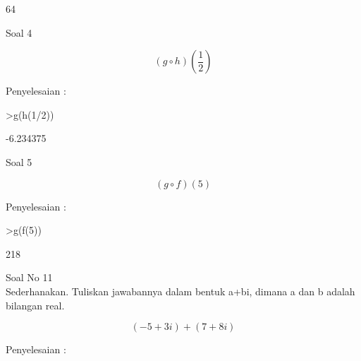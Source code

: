 \begin{eulernotebook}
\begin{eulercomment}
\begin{eulercomment}
\begin{euleroutput}
  64
\end{euleroutput}
\begin{eulercomment}
Soal 4\\
\end{eulercomment}
\begin{eulerformula}
\[
(g \circ h)(\frac{1}{2})
\]
\end{eulerformula}
\begin{eulercomment}
Penyelesaian :
\end{eulercomment}
\begin{eulerprompt}
>g(h(1/2))
\end{eulerprompt}
\begin{euleroutput}
  -6.234375
\end{euleroutput}
\begin{eulercomment}
Soal 5\\
\end{eulercomment}
\begin{eulerformula}
\[
(g \circ f)(5)
\]
\end{eulerformula}
\begin{eulercomment}
Penyelesaian :
\end{eulercomment}
\begin{eulerprompt}
>g(f(5))
\end{eulerprompt}
\begin{euleroutput}
  218\\
  
\end{euleroutput}

\begin{eulercomment}
Soal No 11\\
Sederhanakan. Tuliskan jawabannya dalam bentuk a+bi, dimana a dan b
adalah bilangan real.\\
\end{eulercomment}
\begin{eulerformula}
\[
(-5+3i)+(7+8i)
\]
\end{eulerformula}
\begin{eulercomment}
Penyelesaian :


\end{eulercomment}
\end{eulercomment}
\end{eulercomment}
\end{eulernotebook}
